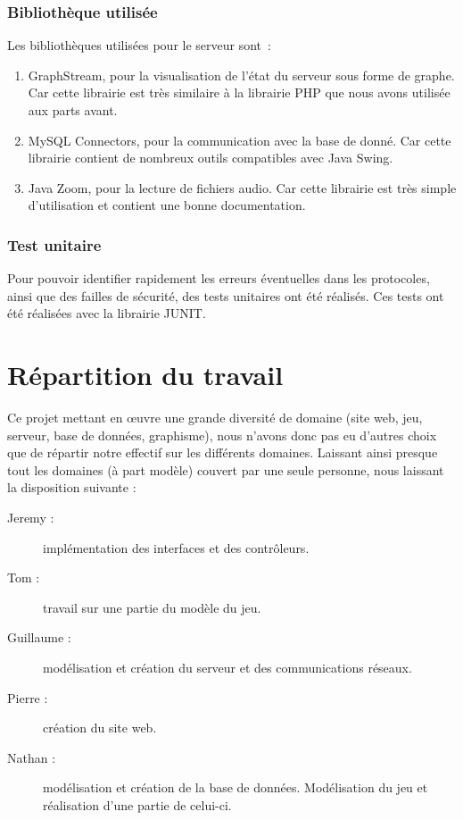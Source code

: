 \documentclass[a4paper,11pt]{report}
\begin{document}
\subsubsection{Bibliothèque utilisée}
Les bibliothèques utilisées pour le serveur sont :
\begin{enumerate}
  \item GraphStream, pour la visualisation de l'état du serveur sous forme de graphe. Car cette librairie est très similaire à la librairie PHP que nous avons utilisée aux parts avant.
  \item MySQL Connectors, pour la communication avec la base de donné. Car cette librairie contient de nombreux outils compatibles avec Java Swing.
  \item Java Zoom, pour la lecture de fichiers audio. Car cette librairie est très simple d’utilisation et contient une bonne documentation.
\end{enumerate}

\subsubsection{Test unitaire}
Pour pouvoir identifier rapidement les erreurs éventuelles dans les protocoles, ainsi que des failles de sécurité, des tests unitaires ont été réalisés. Ces tests ont été réalisées avec la librairie JUNIT. 


	

  \section{Répartition du travail}
    Ce projet mettant en œuvre une grande diversité de domaine (site web, jeu, serveur, base de données, graphisme), nous n'avons donc pas eu d'autres choix que de répartir notre effectif sur les différents domaines. Laissant ainsi presque tout les domaines (à part modèle) couvert par une seule personne, nous laissant la disposition suivante :
    \begin{description}
      \item[Jeremy : ] implémentation des interfaces et des contrôleurs.
      \item[Tom : ] travail sur une partie du modèle du jeu.
      \item[Guillaume :] modélisation et création du serveur et des communications réseaux.
      \item[Pierre :] création du site web.
      \item[Nathan :] modélisation et création de la base de données. Modélisation du jeu et réalisation d'une partie de celui-ci.
    \end{description}
    
\end{document}
